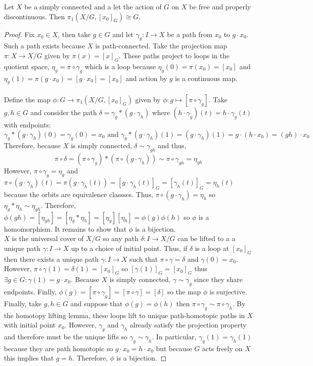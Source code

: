 \documentclass[12pt]{extarticle}
\begin{document}
\newpage

\begin{theorem}
Let $X$ be a simply connected and a let the action of $G$ on $X$ be free and properly discontinuous. Then $\pi_1(X/G, [x_0]_G) \cong G$.
\end{theorem} 

\begin{proof}
Fix $x_0 \in X$, then take $g \in G$ and let $\gamma_g : I \to X$ be a path from $x_0$ to $g \cdot x_0$. Such a path exists because $X$ is path-connected. Take the projection map $\pi : X \to X/G$ given by $\pi(x) = [x]_G$. These paths project to loops in the quotient space, $\eta_g = \pi \circ \gamma_g$ which is a loop because $\eta_g(0) = \pi(x_0) = [x_0]$ and $\eta_g(1) = \pi(g \cdot x_0) = [g \cdot x_0] = [x_0]$ and action by $g$ is a continuous map. \\\\
Define the map $\phi : G \to \pi_1(X/G, [x_0]_G)$ given by $\phi : g \mapsto [\pi \circ \gamma_g]$. Take $g, h \in G$ and consider the path $\delta = \gamma_g * (g \cdot \gamma_h)$  where $(h \cdot \gamma_g)(t) = h \cdot \gamma_g(t)$ with endpoints:
\[\gamma_g * (g \cdot \gamma_h)(0) = \gamma_g(0) = x_0 \text{ and } \gamma_g * (g \cdot \gamma_h)(1) = (g \cdot \gamma_h)(1) = g \cdot (h \cdot x_0) = (gh) \cdot x_0\]
Therefore, because $X$ is simply connected, $\delta \sim \gamma_{gh}$ and thus, 
\[\pi \circ \delta = (\pi \circ \gamma_g) * (\pi \circ (g \cdot \gamma_h)) \sim \pi \circ \gamma_{gh} = \eta_{gh}\]
However, $\pi \circ \gamma_g = \eta_g$ and $\pi \circ (g \cdot \gamma_h)(t) = \pi(g \cdot \gamma_h(t)) = [g \cdot \gamma_h(t)]_G = [\gamma_h(t)]_G = \eta_h(t)$ because the orbits are equivalence classses. Thus, $\pi \circ (g \cdot \gamma_h) = \eta_h$ so $\eta_g * \eta_h \sim \eta_{gh}$. 
Therefore, $\phi(gh) = [\eta_{gh}] = [\eta_g * \eta_h] = [\eta_g] [\eta_h] = \phi(g) \phi(h)$ so $\phi$ is a homomorphism. It remains to show that $\phi$ is a bijection. \bigskip \\
$X$ is the universal cover of $X/G$ so any path $\delta : I \to X/G$ can be lifted to a a unique path $\gamma : I \to X$ up to a choice of initial point. Thus, if $\delta$ is a loop at $[x_0]_G$ then there exists a unique path $\gamma : I \to X$ such that $\pi \circ \gamma = \delta$ and $\gamma(0) = x_0$. However, $\pi \circ \gamma(1) = \delta(1) = [x_0]_G$ so $[\gamma(1)]_G = [x_0]_G$ thus $\exists g \in G : \gamma(1) = g \cdot x_0$. Because $X$ is simply connected, $\gamma \sim \gamma_g$ since they share endpoints. Finlly, $\phi(g) = [\pi \circ \gamma_g] = [\pi \circ \gamma] = [\delta]$ so the map $\phi$ is surjective. Finally, take $g, h \in G$ and suppose that $\phi(g) = \phi(h)$ then $\pi \circ \gamma_g \sim \pi \circ \gamma_h$. By the homotopy lifting lemma, these loops lift to unique path-homotopic paths in $X$ with initial point $x_0$. However, $\gamma_g$ and $\gamma_h$ already satisfy the projection property and therefore must be the unique lifts so $\gamma_g \sim \gamma_h$. In particular, $\gamma_g(1) = \gamma_h(1)$ because they are path homotopic so $g \cdot x_0 = h \cdot x_0$ but because $G$ acts freely on $X$ this implies that $g = h$. Therefore, $\phi$ is a bijection.      
\end{proof}
\end{document}
